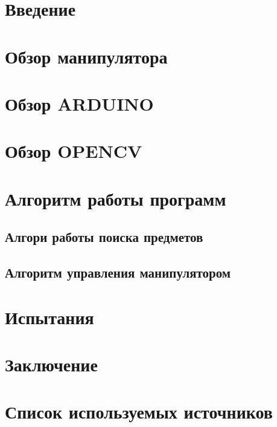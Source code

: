 


  
  
  

 \newpage
 \tableofcontents

 \newpage
 \setcounter{figure}{0}
 \section{Введение}
 
 \newpage
 \section{Обзор манипулятора}
 
 \newpage
 \setcounter{figure}{0}
 \section{Обзор ARDUINO}
 
 \newpage
 \setcounter{figure}{0}
 \section{Обзор OPENCV}
 
 \newpage
 \setcounter{figure}{0}
 \newpage
 \section{Алгоритм работы программ}
 \subsection{Алгори работы поиска предметов}
 
 \subsection{Алгоритм управления манипулятором}
 
 \section{Испытания}
 
 \newpage
 \section{Заключение}
 
 \newpage
 \section*{Список используемых источников}
 
 
 \newpage
 